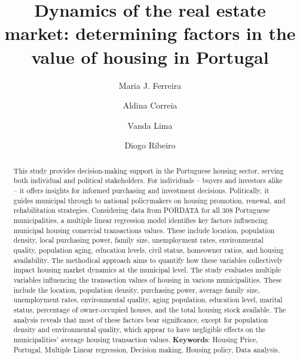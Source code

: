 \documentclass{aip-cp}
\begin{document}
\title{Dynamics of the real estate market: determining factors in the value of housing in Portugal}

\author[aff1]{Maria J. Ferreira}
\author[aff1]{Aldina Correia}

\author[aff1]{Vanda Lima}
\author[aff2]{Diogo Ribeiro}

\maketitle

\begin{abstract}
    This study provides decision-making support in the Portuguese housing sector, serving both individual and political stakeholders. For individuals -- buyers and investors alike -- it offers insights for informed purchasing and investment decisions. Politically, it guides municipal through to national policymakers on housing promotion, renewal, and rehabilitation strategies. Considering data from PORDATA for all 308 Portuguese municipalities, a multiple linear regression model identifies key factors influencing municipal housing comercial transactions values. These include location, population density, local purchasing power, family size, unemployment rates, environmental quality, population aging, education levels, civil status, homeowner ratios, and housing availability. The methodical approach aims to quantify how these variables collectively impact housing market dynamics at the municipal level. The study evaluates multiple variables influencing the transaction values of housing in various municipalities. These include the location, population density, purchasing power, average family size, unemployment rates, environmental quality, aging population, education level, marital status, percentage of owner-occupied houses, and the total housing stock available. The analysis reveals that most of these factors bear significance, except for population density and environmental quality, which appear to have negligible effects on the municipalities' average housing transaction values.
\textbf{Keywords}: Housing Price, Portugal, Multiple Linear regression, Decision making, Housing policy, Data analysis.
\end{abstract}
\end{document}
